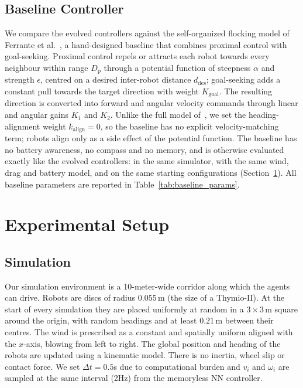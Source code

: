 \documentclass[runningheads]{llncs}
\begin{document}
\subsection{Baseline Controller}
\label{sec:baseline}
We compare the evolved controllers against the self-organized flocking model of Ferrante et al.~\cite{ferrante2012}, a hand-designed baseline that combines proximal control with goal-seeking. Proximal control repels or attracts each robot towards every neighbour within range $D_{\text{p}}$ through a potential function of steepness $\alpha$ and strength $\epsilon$, centred on a desired inter-robot distance $d_{\text{des}}$; goal-seeking adds a constant pull towards the target direction with weight $K_{\text{goal}}$. The resulting direction is converted into forward and angular velocity commands through linear and angular gains $K_1$ and $K_2$. Unlike the full model of~\cite{ferrante2012}, we set the heading-alignment weight $k_{\text{align}}=0$, so the baseline has no explicit velocity-matching term; robots align only as a side effect of the potential function. The baseline has no battery awareness, no compass and no memory, and is otherwise evaluated exactly like the evolved controllers: in the same simulator, with the same wind, drag and battery model, and on the same starting configurations (Section~\ref{sec:EXp_Setup}). All baseline parameters are reported in Table~\ref{tab:baseline_params}.


\section{Experimental Setup}
\label{sec:EXp_Setup}

\subsection{Simulation}
Our simulation environment is a 10-meter-wide corridor along which the agents can drive. Robots are discs of radius $0.055$\,m (the size of a Thymio-II). At the start of every simulation they are placed uniformly at random in a $3 \times 3$\,m square around the origin, with random headings and at least $0.21$\,m between their centres. The wind is prescribed as a constant and spatially uniform aligned with the $x$-axis, blowing from left to right. The global position and heading of the robots are updated using a kinematic model. There is no inertia, wheel slip or contact force. We set $\Delta t = 0.5$s due to computational burden and $v_i$ and $\omega_i$ are sampled at the same interval (2Hz) from the memoryless NN controller.
\end{document}
